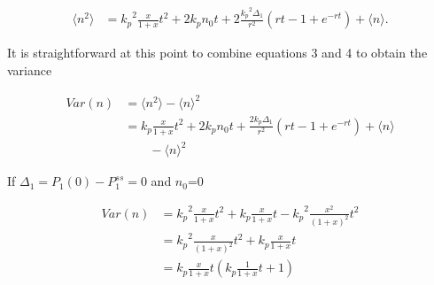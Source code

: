 \begin{equation}
\begin{aligned}
\langle n^2 \rangle & = {k_p}^2 \frac{x}{1+x}t^2 + 2k_pn_0t + 2\frac{{k_p}^2 \Delta_1}{r^2}(rt -1 + e^{-rt}) + \langle n \rangle.
\end{aligned}
\end{equation}

It is straightforward at this point to combine equations 3 and 4 to obtain the variance

\begin{equation}
\begin{aligned}
Var(n) & = \langle n^2 \rangle - {\langle n \rangle}^2\\
	   & = k_p \frac{x}{1+x}t^2 + 2k_pn_0t + \frac{2k_p \Delta_1}{r^2}(rt-1+e^{-rt}) + \langle n \rangle \\
	   & \qquad - {\langle n \rangle}^2
\end{aligned}
\end{equation}

If $\Delta_1 = P_1(0) - P_1^{ss} = 0$ and $n_0$=0

\begin{equation}
\begin{aligned}
Var(n) &  = {k_p}^2 \frac{x}{1+x}t^2 + {k_p} \frac{x}{1+x}t - {k_p}^2 \frac{x^2}{(1+x)^2}t^2 \\
		& = {k_p}^2\frac{x}{(1+x)^2}t^2 + k_p\frac{x}{1+x}t \\
		& = k_p \frac{x}{1+x}t(k_p\frac{1}{1+x}t + 1)
\end{aligned}
\end{equation}



